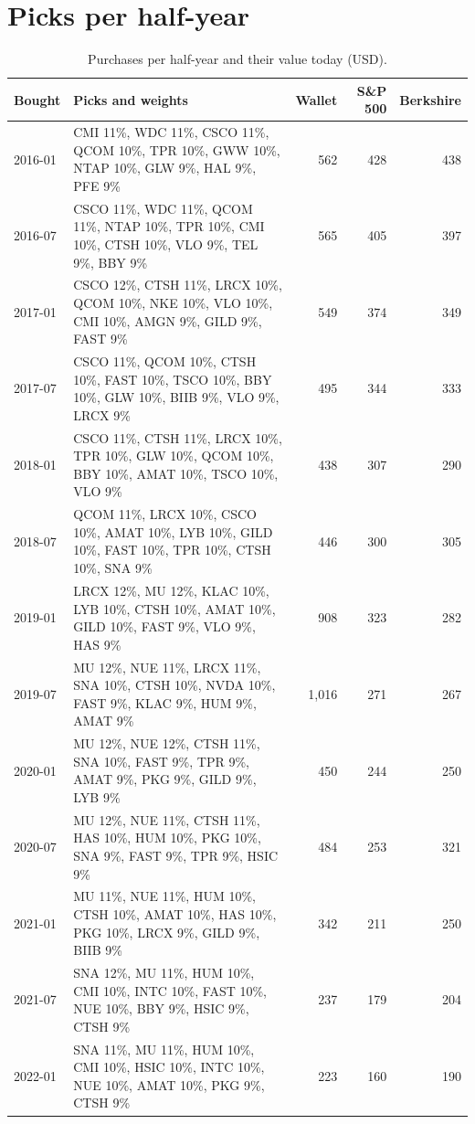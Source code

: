 \documentclass[11pt,a4paper]{article}
\begin{document}
\section{Picks per half-year}
\begin{table}[H]
\centering
\small
\caption{Purchases per half-year and their value today (USD).}\label{tab:picks}
\begin{tabular}{l p{9.2cm} r r r }
\hline
Bought & Picks and weights & Wallet & S\&P 500 & Berkshire \\
\hline
2016-01 & CMI 11\%, WDC 11\%, CSCO 11\%, QCOM 10\%, TPR 10\%, GWW 10\%, NTAP 10\%, GLW 9\%, HAL 9\%, PFE 9\% & 562 & 428 & 438 \\
2016-07 & CSCO 11\%, WDC 11\%, QCOM 11\%, NTAP 10\%, TPR 10\%, CMI 10\%, CTSH 10\%, VLO 9\%, TEL 9\%, BBY 9\% & 565 & 405 & 397 \\
2017-01 & CSCO 12\%, CTSH 11\%, LRCX 10\%, QCOM 10\%, NKE 10\%, VLO 10\%, CMI 10\%, AMGN 9\%, GILD 9\%, FAST 9\% & 549 & 374 & 349 \\
2017-07 & CSCO 11\%, QCOM 10\%, CTSH 10\%, FAST 10\%, TSCO 10\%, BBY 10\%, GLW 10\%, BIIB 9\%, VLO 9\%, LRCX 9\% & 495 & 344 & 333 \\
2018-01 & CSCO 11\%, CTSH 11\%, LRCX 10\%, TPR 10\%, GLW 10\%, QCOM 10\%, BBY 10\%, AMAT 10\%, TSCO 10\%, VLO 9\% & 438 & 307 & 290 \\
2018-07 & QCOM 11\%, LRCX 10\%, CSCO 10\%, AMAT 10\%, LYB 10\%, GILD 10\%, FAST 10\%, TPR 10\%, CTSH 10\%, SNA 9\% & 446 & 300 & 305 \\
2019-01 & LRCX 12\%, MU 12\%, KLAC 10\%, LYB 10\%, CTSH 10\%, AMAT 10\%, GILD 10\%, FAST 9\%, VLO 9\%, HAS 9\% & 908 & 323 & 282 \\
2019-07 & MU 12\%, NUE 11\%, LRCX 11\%, SNA 10\%, CTSH 10\%, NVDA 10\%, FAST 9\%, KLAC 9\%, HUM 9\%, AMAT 9\% & 1,016 & 271 & 267 \\
2020-01 & MU 12\%, NUE 12\%, CTSH 11\%, SNA 10\%, FAST 9\%, TPR 9\%, AMAT 9\%, PKG 9\%, GILD 9\%, LYB 9\% & 450 & 244 & 250 \\
2020-07 & MU 12\%, NUE 11\%, CTSH 11\%, HAS 10\%, HUM 10\%, PKG 10\%, SNA 9\%, FAST 9\%, TPR 9\%, HSIC 9\% & 484 & 253 & 321 \\
2021-01 & MU 11\%, NUE 11\%, HUM 10\%, CTSH 10\%, AMAT 10\%, HAS 10\%, PKG 10\%, LRCX 9\%, GILD 9\%, BIIB 9\% & 342 & 211 & 250 \\
2021-07 & SNA 12\%, MU 11\%, HUM 10\%, CMI 10\%, INTC 10\%, FAST 10\%, NUE 10\%, BBY 9\%, HSIC 9\%, CTSH 9\% & 237 & 179 & 204 \\
2022-01 & SNA 11\%, MU 11\%, HUM 10\%, CMI 10\%, HSIC 10\%, INTC 10\%, NUE 10\%, AMAT 10\%, PKG 9\%, CTSH 9\% & 223 & 160 & 190 \\

\end{tabular}
\end{table}
\end{document}
